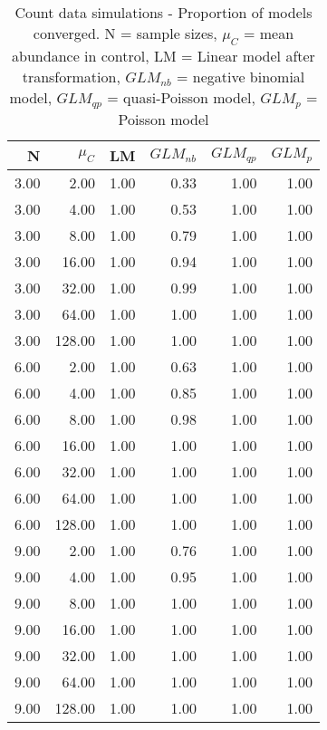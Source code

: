 \begin{table}[H]
\centering
\caption{Count data simulations - Proportion of models converged. N = sample sizes, 
             $\mu_C$ = mean abundance in control, LM = Linear model after transformation, 
             $GLM_{nb}$ = negative binomial model, $GLM_{qp}$ = quasi-Poisson model, 
             $GLM_{p}$ = Poisson model} 
\label{tab:conv}
{\footnotesize
\begin{tabular}{rrrrrr}
  \hline
N & $\mu_C$ & LM & $GLM_{nb}$ & $GLM_{qp}$ & $GLM_{p}$ \\ 
  \hline
3.00 & 2.00 & 1.00 & 0.33 & 1.00 & 1.00 \\ 
  3.00 & 4.00 & 1.00 & 0.53 & 1.00 & 1.00 \\ 
  3.00 & 8.00 & 1.00 & 0.79 & 1.00 & 1.00 \\ 
  3.00 & 16.00 & 1.00 & 0.94 & 1.00 & 1.00 \\ 
  3.00 & 32.00 & 1.00 & 0.99 & 1.00 & 1.00 \\ 
  3.00 & 64.00 & 1.00 & 1.00 & 1.00 & 1.00 \\ 
  3.00 & 128.00 & 1.00 & 1.00 & 1.00 & 1.00 \\ 
  6.00 & 2.00 & 1.00 & 0.63 & 1.00 & 1.00 \\ 
  6.00 & 4.00 & 1.00 & 0.85 & 1.00 & 1.00 \\ 
  6.00 & 8.00 & 1.00 & 0.98 & 1.00 & 1.00 \\ 
  6.00 & 16.00 & 1.00 & 1.00 & 1.00 & 1.00 \\ 
  6.00 & 32.00 & 1.00 & 1.00 & 1.00 & 1.00 \\ 
  6.00 & 64.00 & 1.00 & 1.00 & 1.00 & 1.00 \\ 
  6.00 & 128.00 & 1.00 & 1.00 & 1.00 & 1.00 \\ 
  9.00 & 2.00 & 1.00 & 0.76 & 1.00 & 1.00 \\ 
  9.00 & 4.00 & 1.00 & 0.95 & 1.00 & 1.00 \\ 
  9.00 & 8.00 & 1.00 & 1.00 & 1.00 & 1.00 \\ 
  9.00 & 16.00 & 1.00 & 1.00 & 1.00 & 1.00 \\ 
  9.00 & 32.00 & 1.00 & 1.00 & 1.00 & 1.00 \\ 
  9.00 & 64.00 & 1.00 & 1.00 & 1.00 & 1.00 \\ 
  9.00 & 128.00 & 1.00 & 1.00 & 1.00 & 1.00 \\ 
   \hline
\end{tabular}
}
\end{table}

